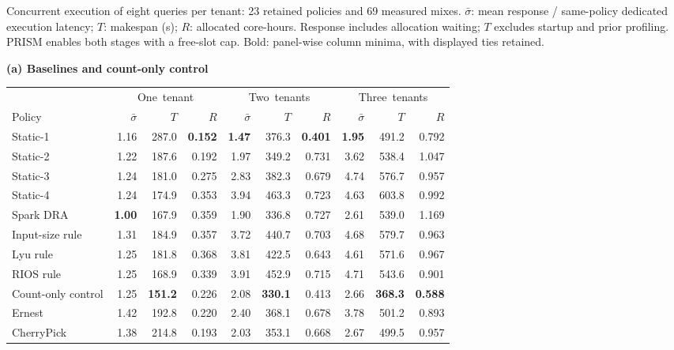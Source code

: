 \caption{Concurrent execution of eight queries per tenant: 23 retained policies and 69 measured mixes. $\bar\sigma$: mean response / same-policy dedicated execution latency; $T$: makespan (s); $R$: allocated core-hours. Response includes allocation waiting; $T$ excludes startup and prior profiling. PRISM enables both stages with a free-slot cap. Bold: panel-wise column minima, with displayed ties retained.}\label{tab:concurrency}\centering\scriptsize
\setlength{\tabcolsep}{2pt}\renewcommand{\arraystretch}{1.02}
\textbf{(a) Baselines and count-only control}\par\smallskip
\begin{tabular*}{\linewidth}{@{\extracolsep{\fill}}lrrrrrrrrr@{}}
\toprule
 & \multicolumn{3}{c}{\mbox{One tenant}} & \multicolumn{3}{c}{\mbox{Two tenants}} & \multicolumn{3}{c}{\mbox{Three tenants}}\\
\mbox{Policy} & \mbox{$\bar\sigma$} & \mbox{$T$} & \mbox{$R$} & \mbox{$\bar\sigma$} & \mbox{$T$} & \mbox{$R$} & \mbox{$\bar\sigma$} & \mbox{$T$} & \mbox{$R$}\\\midrule
Static-1 & 1.16 & 287.0 & \textbf{0.152} & \textbf{1.47} & 376.3 & \textbf{0.401} & \textbf{1.95} & 491.2 & 0.792\\
Static-2 & 1.22 & 187.6 & 0.192 & 1.97 & 349.2 & 0.731 & 3.62 & 538.4 & 1.047\\
Static-3 & 1.24 & 181.0 & 0.275 & 2.83 & 382.3 & 0.679 & 4.74 & 576.7 & 0.957\\
Static-4 & 1.24 & 174.9 & 0.353 & 3.94 & 463.3 & 0.723 & 4.63 & 603.8 & 0.992\\
Spark DRA & \textbf{1.00} & 167.9 & 0.359 & 1.90 & 336.8 & 0.727 & 2.61 & 539.0 & 1.169\\
Input-size rule & 1.31 & 184.9 & 0.357 & 3.72 & 440.7 & 0.703 & 4.68 & 579.7 & 0.963\\
Lyu rule & 1.25 & 181.8 & 0.368 & 3.81 & 422.5 & 0.643 & 4.61 & 571.6 & 0.967\\
RIOS rule & 1.25 & 168.9 & 0.339 & 3.91 & 452.9 & 0.715 & 4.71 & 543.6 & 0.901\\
Count-only control & 1.25 & \textbf{151.2} & 0.226 & 2.08 & \textbf{330.1} & 0.413 & 2.66 & \textbf{368.3} & \textbf{0.588}\\
Ernest & 1.42 & 192.8 & 0.220 & 2.40 & 368.1 & 0.678 & 3.78 & 501.2 & 0.893\\
CherryPick & 1.38 & 214.8 & 0.193 & 2.03 & 353.1 & 0.668 & 2.67 & 499.5 & 0.957\\
\bottomrule\end{tabular*}\par\smallskip
